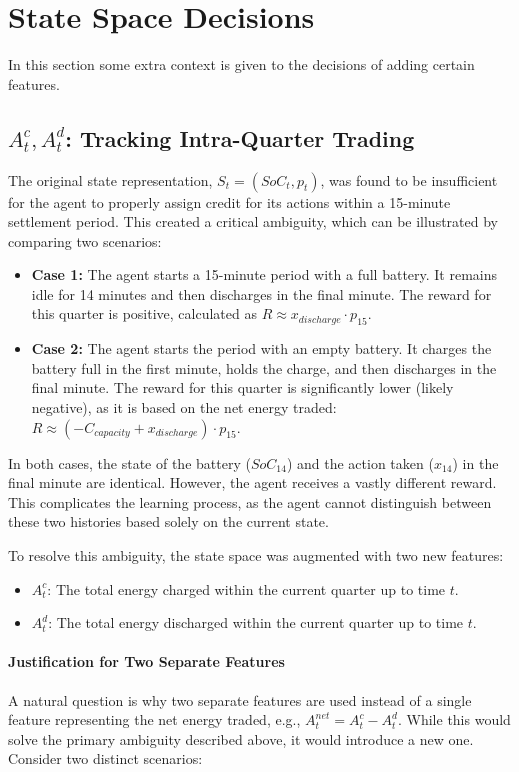 \section{State Space Decisions}
In this section some extra context is given to the decisions of adding certain features.
\subsection{\(A^c_t, A^d_t\): Tracking Intra-Quarter Trading}
    The original state representation, $S_t = (SoC_t, p_t)$, was found to be insufficient for the agent to properly assign credit for its actions within a 15-minute settlement period. This created a critical ambiguity, which can be illustrated by comparing two scenarios:
    
    \begin{itemize}
        \item \textbf{Case 1:} The agent starts a 15-minute period with a full battery. It remains idle for 14 minutes and then discharges in the final minute. The reward for this quarter is positive, calculated as $R \approx x_{discharge} \cdot p_{15}$.
        
        \item \textbf{Case 2:} The agent starts the period with an empty battery. It charges the battery full in the first minute, holds the charge, and then discharges in the final minute. The reward for this quarter is significantly lower (likely negative), as it is based on the net energy traded: $R \approx (-C_{capacity} + x_{discharge}) \cdot p_{15}$.
    \end{itemize}
    
    In both cases, the state of the battery ($SoC_{14}$) and the action taken ($x_{14}$) in the final minute are identical. However, the agent receives a vastly different reward. This complicates the learning process, as the agent cannot distinguish between these two histories based solely on the current state.
    
    To resolve this ambiguity, the state space was augmented with two new features:
    \begin{itemize}
        \item \(A^c_t\): The total energy charged within the current quarter up to time $t$.
        \item \(A^d_t\): The total energy discharged within the current quarter up to time $t$.
    \end{itemize}

    \paragraph{Justification for Two Separate Features}
    A natural question is why two separate features are used instead of a single feature representing the net energy traded, e.g., $A^{net}_t = A^c_t - A^d_t$. While this would solve the primary ambiguity described above, it would introduce a new one. Consider two distinct scenarios:
    
